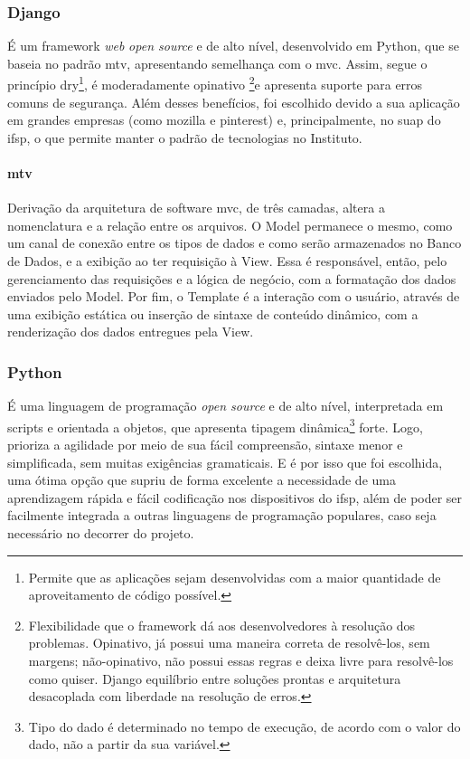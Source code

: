 \subsubsection{Django}
É um \gls{framework} \textit{web} \textit{\gls{open source}} e de alto nível, desenvolvido em Python, que se baseia no padrão \ac{mtv}, apresentando semelhança com o \ac{mvc}. Assim, segue o princípio \ac{dry}\footnote{Permite que as aplicações sejam desenvolvidas com a maior quantidade de aproveitamento de código possível.}, é moderadamente opinativo \footnote{Flexibilidade que o \gls{framework} dá aos desenvolvedores à resolução dos problemas. Opinativo, já possui uma maneira correta de resolvê-los, sem margens; não-opinativo, não possui essas regras e deixa livre para resolvê-los como quiser. Django equilíbrio entre soluções prontas e arquitetura desacoplada com liberdade na resolução de erros. }e apresenta suporte para erros comuns de segurança. Além desses benefícios, foi escolhido devido a sua aplicação em grandes empresas (como \gls{mozilla} e \gls{pinterest}) e, principalmente, no \ac{suap} do \ac{ifsp}, o que permite manter o padrão de tecnologias no Instituto.
\cite{lucas_2021} \cite{andrade_2019}

\paragraph{\ac{mtv}}
Derivação da arquitetura de software \ac{mvc}, de três camadas, altera a nomenclatura e a relação entre os arquivos. O Model permanece o mesmo, como um canal de conexão entre os tipos de dados e como serão armazenados no Banco de Dados, e a exibição ao ter requisição à View. Essa é responsável, então, pelo gerenciamento das requisições e a lógica de negócio, com a formatação dos dados enviados pelo Model. Por fim, o Template é a interação com o usuário, através de uma exibição estática ou inserção de sintaxe de conteúdo dinâmico, com a renderização dos dados entregues pela View.
\cite{silva_2020}
\
\subsubsection{Python}
É uma linguagem de programação \textit{\gls{open source}} e de alto nível, interpretada em scripts e orientada a objetos, que apresenta tipagem dinâmica\footnote{Tipo do dado é determinado no tempo de execução, de acordo com o valor do dado, não a partir da sua variável.} forte. Logo, prioriza a agilidade por meio de sua fácil compreensão, sintaxe menor e simplificada, sem muitas exigências gramaticais. E é por isso que foi escolhida, uma ótima opção que supriu de forma excelente a necessidade de uma aprendizagem rápida e fácil codificação nos dispositivos do \ac{ifsp}, além de poder ser facilmente integrada a outras linguagens de programação populares, caso seja necessário no decorrer do projeto.
\cite{amazon_2023} \cite{melo_2021}

